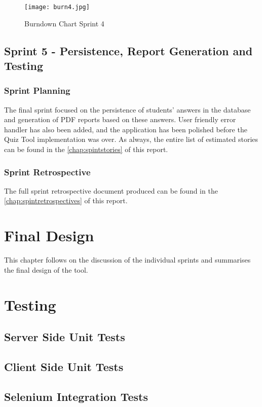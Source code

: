 \begin{figure}[h!]
    \centering
    \texttt{[image: burn4.jpg]}
    \caption{Burndown Chart Sprint 4}
    \label{fig:burn4}
\end{figure}

\section{Sprint 5 - Persistence, Report Generation and Testing}
\subsection{Sprint Planning}
The final sprint focused on the persistence of students' answers in the database and
generation of PDF reports based on these answers. User friendly error handler has
also been added, and the application has been polished before the Quiz Tool implementation
was over. As always, the entire list of estimated stories
can be found in the \autoref{chap:spintstories} of this report.

\subsection{Sprint Retrospective}
The full sprint retrospective document produced can be found in the
\autoref{chap:spintretrospectives} of this report.

\chapter{Final Design}

This chapter follows on the discussion of the individual sprints and summarises
the final design of the tool.

\chapter{Testing}

\section{Server Side Unit Tests}
\section{Client Side Unit Tests}
\section{Selenium Integration Tests}

